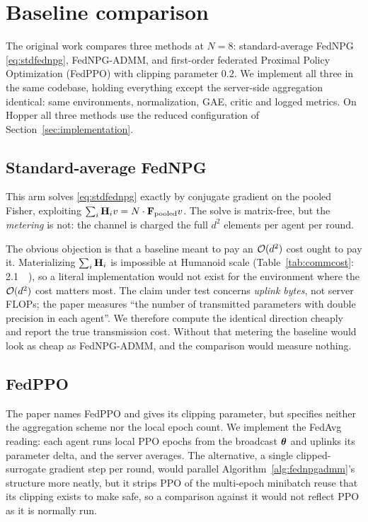 \section{Baseline comparison}
\label{sec:baselines}

The original work compares three methods at $N = 8$: standard-average FedNPG
\eqref{eq:stdfednpg}, FedNPG-ADMM, and first-order federated Proximal Policy Optimization (FedPPO) with clipping
parameter $0.2$. We implement all three in the same codebase, holding
everything except the server-side aggregation identical: same environments, normalization, GAE, critic and logged metrics. On Hopper all three
methods use the reduced configuration of Section~\ref{sec:implementation}.

\subsection{Standard-average FedNPG}

This arm solves \eqref{eq:stdfednpg} exactly by conjugate gradient on the
pooled Fisher, exploiting $\sum_i \mathbf{H}_i v = N \cdot \mathbf{F}_{\text{pooled}} v$.
The solve is matrix-free, but the \emph{metering} is not: the channel is
charged the full $d^2$ elements per agent per round.

The obvious objection is that a baseline meant to pay an $\mathcal{O}(d^2)$ cost ought
to pay it. Materializing $\sum_i \mathbf{H}_i$ is impossible at Humanoid scale
(Table~\ref{tab:commcost}: \SI{2.1}{\peta\byte}), so a literal implementation
would not exist for the environment where the $\mathcal{O}(d^2)$ cost matters most.
The claim under test concerns \emph{uplink bytes}, not server FLOPs; the paper
measures ``the number of transmitted parameters with double precision in each
agent''. We therefore compute the identical direction cheaply and report the
true transmission cost. Without that metering the baseline would look as cheap as FedNPG-ADMM, and the
comparison would measure nothing.

\subsection{FedPPO}

The paper names FedPPO and gives its clipping parameter, but specifies neither
the aggregation scheme nor the local epoch count. We implement the
FedAvg reading: each agent runs local PPO epochs from the broadcast $\boldsymbol{\theta}$
and uplinks its parameter delta, and the server averages. The alternative, a
single clipped-surrogate gradient step per round, would parallel
Algorithm~\ref{alg:fednpgadmm}'s structure more neatly, but it strips PPO of
the multi-epoch minibatch reuse that its clipping exists to make safe, so a
comparison against it would not reflect PPO as it is normally run.


